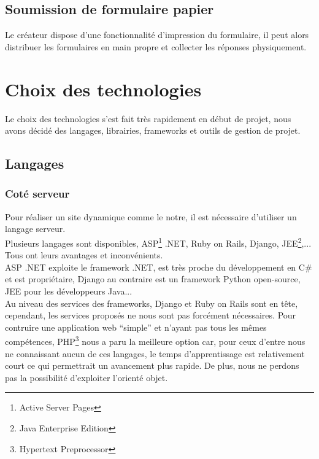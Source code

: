 \documentclass{sigplanconf}
\begin{document}
\subsection{Soumission de formulaire papier}
Le créateur dispose d’une fonctionnalité d’impression du formulaire, il peut alors distribuer les formulaires en main propre et collecter les réponses physiquement. \\


\section{Choix des technologies}
Le choix des technologies s’est fait très rapidement en début de projet, nous avons décidé des langages, librairies, frameworks et outils de gestion de projet.
\subsection{Langages}
\subsubsection{Coté serveur}
Pour réaliser un site dynamique comme le notre, il est nécessaire d'utiliser un langage serveur.\\
Plusieurs langages sont disponibles, ASP\footnote{Active Server Pages} .NET, Ruby on Rails, Django, JEE\footnote{Java Enterprise Edition},... Tous ont leurs avantages et inconvénients.\\
ASP .NET exploite le framework .NET, est très proche du développement en C\# et est propriétaire, Django au contraire est un framework Python open-source, JEE pour les développeurs Java...\\
Au niveau des services des frameworks, Django et Ruby on Rails sont en tête, cependant, les services proposés ne nous sont pas forcément nécessaires. Pour contruire une application web ``simple'' et n'ayant pas tous les mêmes compétences, PHP\footnote{Hypertext Preprocessor} nous a paru la meilleure option car, pour ceux d'entre nous ne connaissant aucun de ces langages, le temps d'apprentissage est relativement court ce qui permettrait un avancement plus rapide. De plus, nous ne perdons pas la possibilité d'exploiter l'orienté objet.\\
\end{document}
